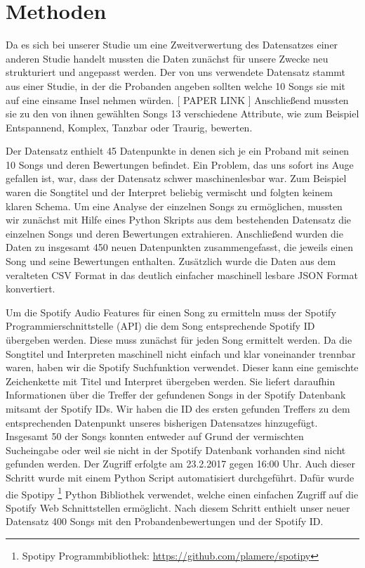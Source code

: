 \section*{Methoden}
\label{sec:Methoden}

Da es sich bei unserer Studie um eine Zweitverwertung des Datensatzes einer anderen Studie handelt mussten die Daten zunächst für unsere Zwecke neu strukturiert und angepasst werden.
Der von uns verwendete Datensatz stammt aus einer Studie, in der die Probanden angeben sollten welche 10 Songs sie mit auf eine einsame Insel nehmen würden. [ PAPER LINK ]
Anschließend mussten sie zu den von ihnen gewählten Songs 13 verschiedene Attribute, wie zum Beispiel Entspannend, Komplex, Tanzbar oder Traurig, bewerten.

Der Datensatz enthielt 45 Datenpunkte in denen sich je ein Proband mit seinen 10 Songs und deren Bewertungen befindet.
Ein Problem, das uns sofort ins Auge gefallen ist, war, dass der Datensatz schwer maschinenlesbar war. 
Zum Beispiel waren die Songtitel und der Interpret beliebig vermischt und folgten keinem klaren Schema.
Um eine Analyse der einzelnen Songs zu ermöglichen, mussten wir zunächst mit Hilfe eines Python Skripts aus dem bestehenden Datensatz die einzelnen Songs und deren Bewertungen extrahieren. 
Anschließend wurden die Daten zu insgesamt 450 neuen Datenpunkten zusammengefasst, die jeweils einen Song und seine Bewertungen enthalten.
Zusätzlich wurde die Daten aus dem veralteten CSV Format in das deutlich einfacher maschinell lesbare JSON Format konvertiert.

Um die Spotify Audio Features für einen Song zu ermitteln muss der Spotify Programmierschnittstelle (API) die dem Song entsprechende Spotify ID übergeben werden.
Diese muss zunächst für jeden Song ermittelt werden.
Da die Songtitel und Interpreten maschinell nicht einfach und klar voneinander trennbar waren, haben wir die Spotify Suchfunktion verwendet.
Dieser kann eine gemischte Zeichenkette mit Titel und Interpret übergeben werden.
Sie liefert daraufhin Informationen über die Treffer der gefundenen Songs in der Spotify Datenbank mitsamt der Spotify IDs.
Wir haben die ID des ersten gefunden Treffers zu dem entsprechenden Datenpunkt unseres bisherigen Datensatzes hinzugefügt.
Insgesamt 50 der Songs konnten entweder auf Grund der vermischten Sucheingabe oder weil sie nicht in der Spotify Datenbank vorhanden sind nicht gefunden werden.
Der Zugriff erfolgte am 23.2.2017 gegen 16:00 Uhr.
Auch dieser Schritt wurde mit einem Python Script automatisiert durchgeführt.
Dafür wurde die Spotipy \footnote{Spotipy Programmbibliothek: \url{https://github.com/plamere/spotipy}} Python Bibliothek verwendet, welche einen einfachen Zugriff auf die Spotify Web Schnittstellen ermöglicht.
Nach diesem Schritt enthielt unser neuer Datensatz 400 Songs mit den Probandenbewertungen und der Spotify ID.

